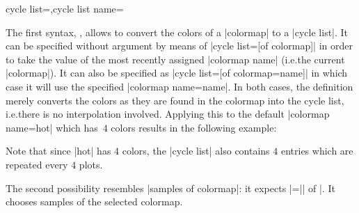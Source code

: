 \begin{pgfplotskeylist}{cycle list=,cycle list name=}
{    The first syntax, , allows to convert the
    colors of a |colormap| to a |cycle list|. It can be specified without
    argument by means of |cycle list={[of colormap]}| in order to take the
    value of the most recently assigned |colormap name| (i.e.\@ the current
    |colormap|). It can also be specified as |cycle list={[of colormap=name]}|
    in which case it will use the specified |colormap name=name|. In both
    cases, the definition merely converts the colors as they are found in the
    colormap into the cycle list, i.e.\@ there is no interpolation involved.
    Applying this to the default |colormap name=hot| which has~$4$ colors
    results in the following example:
\begin{codeexample}[]
\end{codeexample}
    Note that since |hot| has $4$ colors, the |cycle list| also contains $4$
    entries which are repeated every $4$ plots.

    The second possibility resembles |samples of colormap|: it expects
    |=|| of |.
    It chooses  samples of the selected colormap.

}
\end{pgfplotskeylist}
